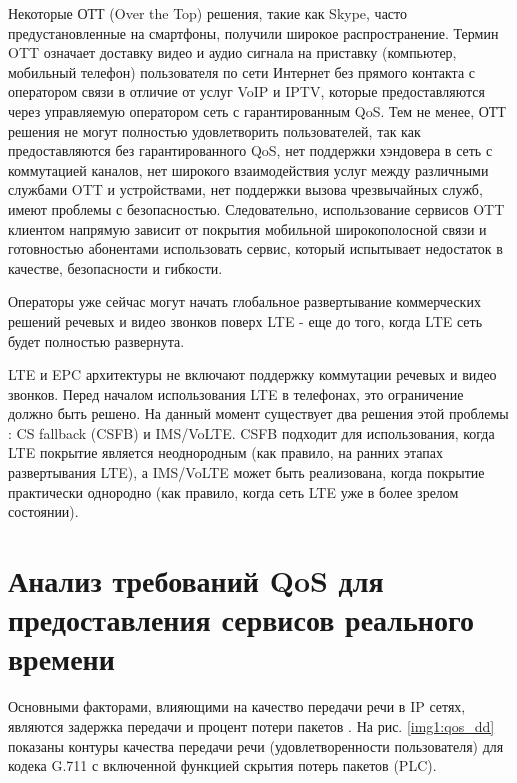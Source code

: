 Некоторые ОТТ (Over the Top) решения, такие как Skype, часто предустановленные на смартфоны, получили широкое распространение. Термин OTT означает доставку видео и аудио сигнала на приставку (компьютер, мобильный телефон) пользователя по сети Интернет без прямого контакта с оператором связи в отличие от услуг VoIP и IPTV, которые предоставляются через управляемую оператором сеть с гарантированным QoS. Тем не менее, ОТТ решения не могут полностью удовлетворить пользователей, так как предоставляются без гарантированного QoS, нет поддержки хэндовера в сеть с коммутацией каналов, нет широкого взаимодействия услуг между различными службами OTT и устройствами, нет поддержки вызова чрезвычайных служб, имеют проблемы с безопасностью. Следовательно, использование сервисов OTT клиентом напрямую зависит от покрытия мобильной широкополосной связи и готовностью абонентами использовать сервис, который испытывает недостаток в качестве, безопасности и гибкости. 

Операторы уже сейчас могут начать глобальное развертывание коммерческих решений речевых и видео звонков поверх LTE - еще до того, когда LTE сеть будет полностью развернута.

LTE и EPC архитектуры не включают поддержку коммутации речевых и видео звонков. 
Перед началом использования LTE в телефонах, это ограничение должно быть решено. На данный момент существует два решения этой проблемы \cite{ericsson_backgrounder}: CS fallback (CSFB) и IMS/VoLTE. CSFB подходит для использования, когда LTE покрытие является неоднородным (как правило, на ранних этапах развертывания LTE), а IMS/VoLTE может быть реализована, когда покрытие практически однородно (как правило, когда сеть LTE уже в более зрелом состоянии).






\section{Анализ требований QoS для предоставления сервисов реального времени } \label{sect_qos}

Основными факторами,  влияющими на качество передачи речи в IP  сетях,  являются задержка передачи и процент потери пакетов \cite{G114}.
На рис. \ref{img1:qos_dd} показаны контуры качества передачи речи (удовлетворенности пользователя) для кодека G.711 с включенной функцией скрытия потерь пакетов (PLC).

